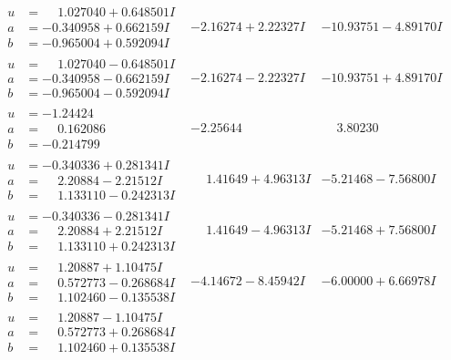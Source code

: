\documentclass[1p]{elsarticle_modified}
\theoremstyle{definition}
\begin{document}
$$\begin{array}{c|c|c}
\begin{aligned}
u &= \phantom{-}1.027040 + 0.648501 I \\
a &= -0.340958 + 0.662159 I \\
b &= -0.965004 + 0.592094 I\end{aligned}
 & -2.16274 + 2.22327 I & -10.93751 - 4.89170 I \\ \hline\begin{aligned}
u &= \phantom{-}1.027040 - 0.648501 I \\
a &= -0.340958 - 0.662159 I \\
b &= -0.965004 - 0.592094 I\end{aligned}
 & -2.16274 - 2.22327 I & -10.93751 + 4.89170 I \\ \hline\begin{aligned}
u &= -1.24424\phantom{ +0.000000I} \\
a &= \phantom{-}0.162086\phantom{ +0.000000I} \\
b &= -0.214799\phantom{ +0.000000I}\end{aligned}
 & -2.25644\phantom{ +0.000000I} & \phantom{-}3.80230\phantom{ +0.000000I} \\ \hline\begin{aligned}
u &= -0.340336 + 0.281341 I \\
a &= \phantom{-}2.20884 - 2.21512 I \\
b &= \phantom{-}1.133110 - 0.242313 I\end{aligned}
 & \phantom{-}1.41649 + 4.96313 I & -5.21468 - 7.56800 I \\ \hline\begin{aligned}
u &= -0.340336 - 0.281341 I \\
a &= \phantom{-}2.20884 + 2.21512 I \\
b &= \phantom{-}1.133110 + 0.242313 I\end{aligned}
 & \phantom{-}1.41649 - 4.96313 I & -5.21468 + 7.56800 I \\ \hline\begin{aligned}
u &= \phantom{-}1.20887 + 1.10475 I \\
a &= \phantom{-}0.572773 - 0.268684 I \\
b &= \phantom{-}1.102460 - 0.135538 I\end{aligned}
 & -4.14672 - 8.45942 I & -6.00000 + 6.66978 I \\ \hline\begin{aligned}
u &= \phantom{-}1.20887 - 1.10475 I \\
a &= \phantom{-}0.572773 + 0.268684 I \\
b &= \phantom{-}1.102460 + 0.135538 I\end{aligned}

\end{array}$$
\end{document}
